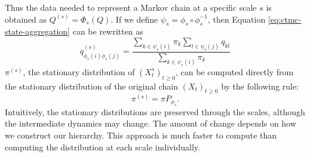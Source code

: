%
Thus the data needed to represent a Markov chain at a specific scale $s$ is obtained as $Q^{(s)} = \Phi_s(Q)$.
If we define $\psi_s = \phi_s \circ \phi_s^{-1}$, then Equation \ref{eq:ctmc-state-aggregation} can be rewritten as
\begin{equation}
	\label{eq:ctmc-aggregation-alternative}
	q_{\phi_s(i)\phi_s(j)}^{(s)} = \frac{\sum_{k \in \psi_s(i)}\pi_k \sum_{l \in \psi_s(j)} q_{kl}}{\sum_{k \in \psi_s(i)}\pi_k}
\end{equation}
$\pi^{(s)}$, the stationary distribution of $(X_t^{s})_{t \ge 0}$, can be computed directly from
the stationary distribution of the original chain $(X_t)_{t \ge 0}$ by the following rule:
\begin{equation}
	\nonumber
	\pi^{(s)} = \pi P_{\phi_s}.
\end{equation}
Intuitively, the stationary distributions are preserved through the scales, although the intermediate dynamics may change. The amount of change depends on how we construct our hierarchy. This approach is much faster to compute than computing the distribution at each scale individually.

